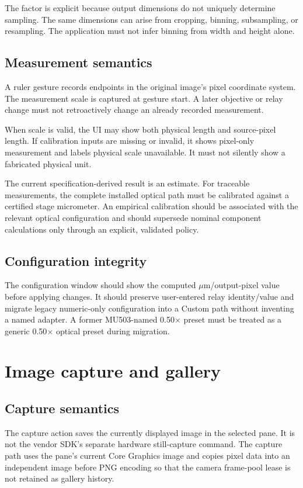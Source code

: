 \documentclass[11pt,a4paper,oneside]{article}
\begin{document}
The factor is explicit because output dimensions do not uniquely determine sampling. The same dimensions can arise from cropping, binning, subsampling, or resampling. The application must not infer binning from width and height alone.

\subsection{Measurement semantics}
A ruler gesture records endpoints in the original image's pixel coordinate system. The measurement scale is captured at gesture start. A later objective or relay change must not retroactively change an already recorded measurement.

When scale is valid, the UI may show both physical length and source-pixel length. If calibration inputs are missing or invalid, it shows pixel-only measurement and labels physical scale unavailable. It must not silently show a fabricated physical unit.

The current specification-derived result is an estimate. For traceable measurements, the complete installed optical path must be calibrated against a certified stage micrometer. An empirical calibration should be associated with the relevant optical configuration and should supersede nominal component calculations only through an explicit, validated policy.

\subsection{Configuration integrity}
The configuration window should show the computed $\mu$m/output-pixel value before applying changes. It should preserve user-entered relay identity/value and migrate legacy numeric-only configuration into a Custom path without inventing a named adapter. A former MU503-named 0.50$\times$ preset must be treated as a generic 0.50$\times$ optical preset during migration.

\section{Image capture and gallery}

\subsection{Capture semantics}
The capture action saves the currently displayed image in the selected pane. It is not the vendor SDK's separate hardware still-capture command. The capture path uses the pane's current Core Graphics image and copies pixel data into an independent image before PNG encoding so that the camera frame-pool lease is not retained as gallery history.
\end{document}
